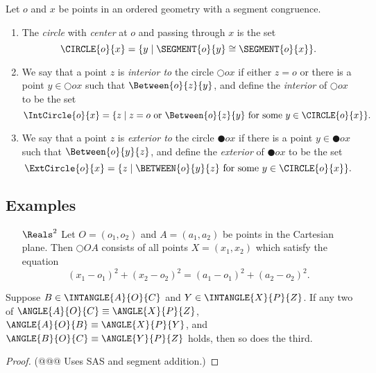 \begin{dfn}[Circle]
Let \(o\) and \(x\) be points in an ordered geometry with a segment congruence.
\begin{enumerate}
\item The \emph{circle} with \emph{center} at \(o\) and passing through \(x\) is the set \[ \CIRCLE{o}{x} = \{ y \mid \SEGMENT{o}{y} \cong \SEGMENT{o}{x} \}. \]
\item We say that a point \(z\) is \emph{interior to} the circle \(\Circle{o}{x}\) if either \(z = o\) or there is a point \(y \in \Circle{o}{x}\) such that \(\Between{o}{z}{y}\), and define the \emph{interior} of \(\Circle{o}{x}\) to be the set \[ \IntCircle{o}{x} = \{ z \mid z = o\ \mathrm{or}\ \Between{o}{z}{y}\ \mathrm{for\ some}\ y \in \CIRCLE{o}{x} \}. \]
\item We say that a point \(z\) is \emph{exterior to} the circle \(\CIRCLE{o}{x}\) if there is a point \(y \in \CIRCLE{o}{x}\) such that \(\Between{o}{y}{z}\), and define the \emph{exterior} of \(\CIRCLE{o}{x}\) to be the set \[ \ExtCircle{o}{x} = \{ z \mid \BETWEEN{o}{y}{z}\ \mathrm{for\ some}\ y \in \CIRCLE{o}{x} \}. \]
\end{enumerate}
\end{dfn}

\subsection*{Examples}

\begin{enumerate}
\item[\(\Reals^2\)] Let \(O = (o_1, o_2)\) and \(A = (a_1, a_2)\) be points in the Cartesian plane.
Then \(\Circle{O}{A}\) consists of all points \(X = (x_1, x_2)\) which satisfy the equation \[ (x_1 - o_1)^2 + (x_2 - o_2)^2 = (a_1 - o_1)^2 + (a_2 - o_2)^2. \]
\end{enumerate}



\begin{prop}
Suppose \(B \in \INTANGLE{A}{O}{C}\) and \(Y \in \INTANGLE{X}{P}{Z}\).
If any two of \(\ANGLE{A}{O}{C} \equiv \ANGLE{X}{P}{Z}\), \(\ANGLE{A}{O}{B} \equiv \ANGLE{X}{P}{Y}\), and \(\ANGLE{B}{O}{C} \equiv \ANGLE{Y}{P}{Z}\) holds, then so does the third.
\end{prop}

\begin{proof}
(@@@ Uses SAS and segment addition.)
\end{proof}
